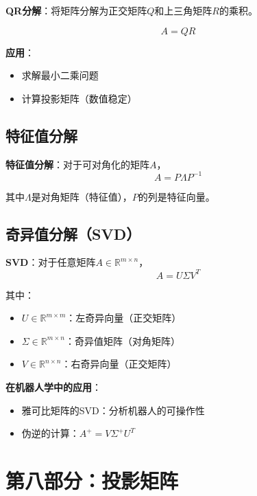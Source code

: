 \documentclass[12pt,a4paper]{article}
\begin{document}
\textbf{QR分解}：将矩阵分解为正交矩阵$Q$和上三角矩阵$R$的乘积。

\begin{equation}
A = QR
\end{equation}

\textbf{应用}：
\begin{itemize}
\item 求解最小二乘问题
\item 计算投影矩阵（数值稳定）
\end{itemize}

\subsection{特征值分解}

\textbf{特征值分解}：对于可对角化的矩阵$A$，
\begin{equation}
A = P \Lambda P^{-1}
\end{equation}

其中$\Lambda$是对角矩阵（特征值），$P$的列是特征向量。

\subsection{奇异值分解（SVD）}

\textbf{SVD}：对于任意矩阵$A \in \mathbb{R}^{m \times n}$，
\begin{equation}
A = U \Sigma V^T
\end{equation}

其中：
\begin{itemize}
\item $U \in \mathbb{R}^{m \times m}$：左奇异向量（正交矩阵）
\item $\Sigma \in \mathbb{R}^{m \times n}$：奇异值矩阵（对角矩阵）
\item $V \in \mathbb{R}^{n \times n}$：右奇异向量（正交矩阵）
\end{itemize}

\textbf{在机器人学中的应用}：
\begin{itemize}
\item 雅可比矩阵的SVD：分析机器人的可操作性
\item 伪逆的计算：$A^+ = V \Sigma^+ U^T$
\end{itemize}

\section{第八部分：投影矩阵}
\end{document}
